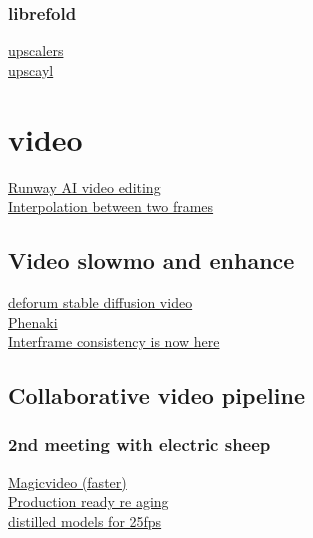 {\subsubsection{librefold}
\href{https://upscale.wiki/wiki/Model_Database}{upscalers}\\
\href{https://github.com/upscayl/upscayl}{upscayl}\\
\section{video}
\href{https://www.youtube.com/c/RunwayML}{Runway AI video editing}\\
\href{https://film-net.github.io/}{Interpolation between two frames}\\
\subsection{Video slowmo and enhance}
\href{https://github.com/HelixNGC7293/DeforumStableDiffusionLocal}{deforum stable diffusion video}\\
\href{https://phenaki.video/}{Phenaki}\\
\href{https://twitter.com/cut_pow/status/1576748659051749377}{Interframe consistency is now here}\\
\subsection{Collaborative video pipeline}
\subsubsection{2nd meeting with electric sheep}
\href{https://magicvideo.github.io/}{Magicvideo (faster)}\\
\href{https://studios.disneyresearch.com/2022/11/30/production-ready-face-re-aging-for-visual-effects/}{Production ready re aging}\\
\href{https://arxiv.org/abs/2202.00512}{distilled models for 25fps}\\
}
